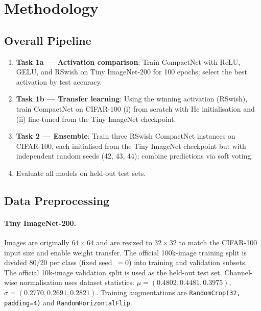 \documentclass[11pt,letterpaper]{article}
\begin{document}
\section{Methodology}

\subsection{Overall Pipeline}

\begin{enumerate}[noitemsep]
  \item \textbf{Task 1a --- Activation comparison}: Train CompactNet with ReLU,
        GELU, and RSwish on Tiny ImageNet-200 for 100 epochs; select the best
        activation by test accuracy.
  \item \textbf{Task 1b --- Transfer learning}: Using the winning activation (RSwish),
        train CompactNet on CIFAR-100 (i) from scratch with He initialisation and
        (ii) fine-tuned from the Tiny ImageNet checkpoint.
  \item \textbf{Task 2 --- Ensemble}: Train three RSwish CompactNet instances on
        CIFAR-100, each initialised from the Tiny ImageNet checkpoint but with
        independent random seeds (42, 43, 44); combine predictions via soft voting.
  \item Evaluate all models on held-out test sets.
\end{enumerate}

\subsection{Data Preprocessing}

\paragraph{Tiny ImageNet-200.}
Images are originally $64\!\times\!64$ and are resized to $32\!\times\!32$ to match
the CIFAR-100 input size and enable weight transfer.
The official 100k-image training split is divided 80/20 per class (fixed seed~$=0$)
into training and validation subsets.
The official 10k-image validation split is used as the held-out test set.
Channel-wise normalisation uses dataset statistics:
$\mu = (0.4802, 0.4481, 0.3975)$,
$\sigma = (0.2770, 0.2691, 0.2821)$.
Training augmentations are \texttt{RandomCrop(32, padding=4)} and
\texttt{RandomHorizontalFlip}.
\end{document}

